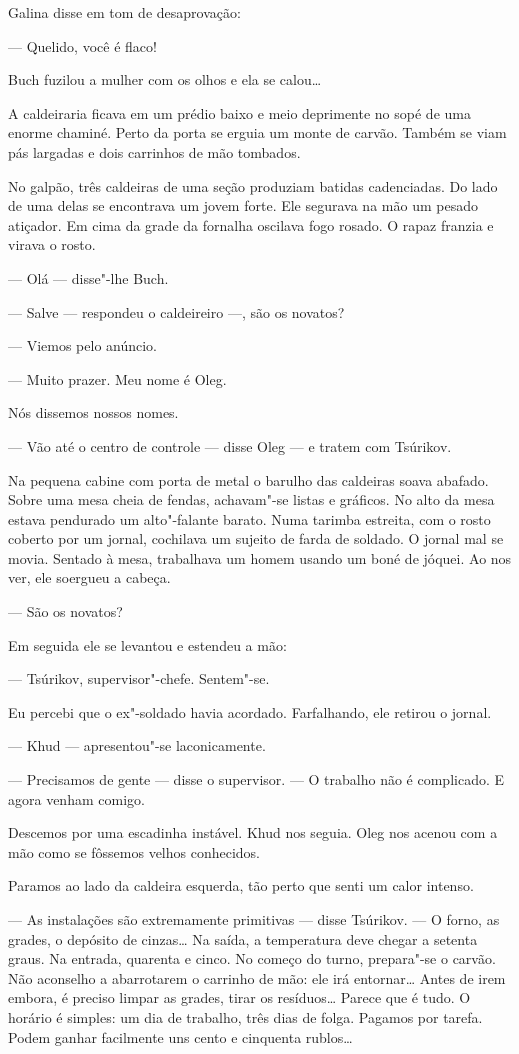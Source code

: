 Galina disse em tom de desaprovação:

--- Quelido, você é flaco!

Buch fuzilou a mulher com os olhos e ela se calou\ldots{}

A caldeiraria ficava em um prédio baixo e meio deprimente no sopé de uma
enorme chaminé. Perto da porta se erguia um monte de carvão. Também se viam
pás largadas e dois carrinhos de mão tombados.

No galpão, três caldeiras de uma seção produziam batidas cadenciadas. Do
lado de uma delas se encontrava um jovem forte. Ele segurava na mão um
pesado atiçador. Em cima da grade da fornalha oscilava fogo
rosado. O rapaz franzia e virava o rosto.

--- Olá --- disse"-lhe Buch.

--- Salve --- respondeu o caldeireiro ---, são os novatos?

--- Viemos pelo anúncio.

--- Muito prazer. Meu nome é Oleg.

Nós dissemos nossos nomes.

--- Vão até o centro de controle --- disse Oleg --- e tratem com
Tsúrikov.

Na pequena cabine com porta de metal o barulho das caldeiras soava
abafado. Sobre uma mesa cheia de fendas, achavam"-se listas e gráficos. No
alto da mesa estava pendurado um alto"-falante barato. Numa tarimba
estreita, com o rosto coberto por um jornal, cochilava um sujeito de
farda de soldado. O jornal mal se movia. Sentado à mesa, trabalhava um
homem usando um boné de jóquei. Ao nos ver, ele soergueu a cabeça.

--- São os novatos?

Em seguida ele se levantou e estendeu a mão:

--- Tsúrikov, supervisor"-chefe. Sentem"-se.

Eu percebi que o ex"-soldado havia acordado. Farfalhando, ele retirou o
jornal.

--- Khud --- apresentou"-se laconicamente.

--- Precisamos de gente --- disse o supervisor. --- O trabalho não é
complicado. E agora venham comigo.

Descemos por uma escadinha instável. Khud nos seguia. Oleg nos acenou
com a mão como se fôssemos velhos conhecidos.

Paramos ao lado da caldeira esquerda, tão perto que senti um calor
intenso.

--- As instalações são extremamente primitivas --- disse Tsúrikov. --- O
forno, as grades, o depósito de cinzas\ldots{} Na saída, a
temperatura deve chegar a setenta graus. Na entrada, quarenta e cinco. No
começo do turno, prepara"-se o carvão. Não aconselho a abarrotarem o
carrinho de mão: ele irá entornar\ldots{} Antes de irem embora, é preciso
limpar as grades, tirar os resíduos\ldots{} Parece que é tudo. O horário é
simples: um dia de trabalho, três dias de folga. Pagamos por tarefa.
Podem ganhar facilmente uns cento e cinquenta rublos\ldots{}

